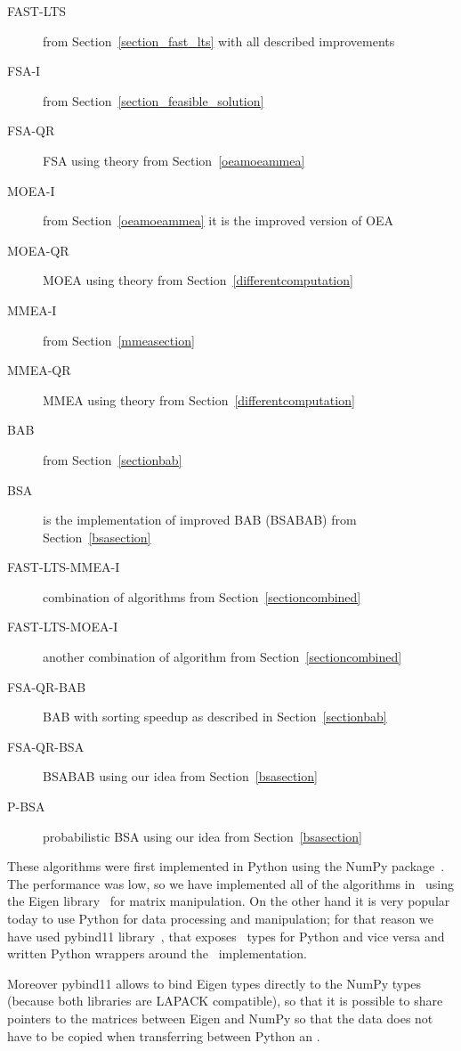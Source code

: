 \begin{description}
    \item[FAST-LTS] from Section~\ref{section_fast_lts} with all described improvements
    \item[FSA-I] from Section~\ref{section_feasible_solution}
    \item[FSA-QR] FSA using theory from Section~\ref{oeamoeammea}
    \item[MOEA-I] from Section~\ref{oeamoeammea} it is the improved version of OEA
    \item[MOEA-QR] MOEA using theory from Section~\ref{differentcomputation}
    \item[MMEA-I] from Section~\ref{mmeasection}
    \item[MMEA-QR] MMEA using theory from Section~\ref{differentcomputation}
    \item[BAB] from Section~\ref{sectionbab}
    \item[BSA] is the implementation of improved BAB (BSABAB) from Section~\ref{bsasection}
    \item[FAST-LTS-MMEA-I] combination of algorithms from Section~\ref{sectioncombined}
    \item[FAST-LTS-MOEA-I] another combination of algorithm from Section~\ref{sectioncombined}
    \item[FSA-QR-BAB] BAB with sorting speedup as described in Section~\ref{sectionbab}
    \item[FSA-QR-BSA] BSABAB using our idea from Section~\ref{bsasection}
    \item[P-BSA] probabilistic BSA using our idea from Section~\ref{bsasection}
\end{description}

These algorithms were first implemented in Python using the NumPy package~\cite{numpy}. The performance was low, so we have implemented all of the algorithms in \CC \ using the Eigen library~\cite{eigenweb} for matrix manipulation. On the other hand it is very popular today to use Python for data processing and manipulation; for that reason we have used pybind11 library~\cite{pybind11}, that exposes \CC \ types for Python and vice versa and written Python wrappers around the \CC \ implementation. 

Moreover pybind11 allows to bind Eigen types directly to the NumPy types (because both libraries are LAPACK compatible), so that it is possible to share pointers to the matrices between Eigen and NumPy so that the data does not have to be copied when transferring between Python an \CC.

